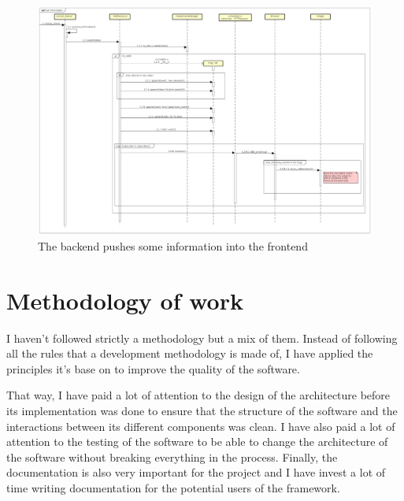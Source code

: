 \documentclass[12pt]{article}
\begin{document}
            \thispagestyle{empty}
            \begin{landscape}
                \begin{figure}[h]
                    \centering
                    \includegraphics[height=\textheight]{push_information}
                    \caption{The backend pushes some information into the
                    frontend}
                \end{figure}
            \end{landscape}
            \restoregeometry

    \section{Methodology of work}
        I haven't followed strictly a methodology but a mix of them. Instead of
        following all the rules that a development methodology is made of, I
        have applied the principles it's base on to improve the quality of the
        software.
        
        That way, I have paid a lot of attention to the design of the
        architecture before its implementation was done to ensure that the
        structure of the software and the interactions between its different
        components was clean. I have also paid a lot of attention to the
        testing of the software to be able to change the architecture of the
        software without breaking everything in the process. Finally, the
        documentation is also very important for the project and I have invest a
        lot of time writing documentation for the potential users of the
        framework.
\end{document}

